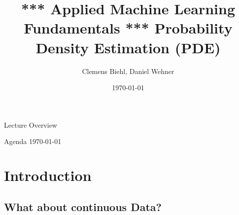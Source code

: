 


\title[Probability Density Estimation]{*** Applied Machine Learning Fundamentals *** Probability Density Estimation (PDE)}
\author{Clemens Biehl, Daniel Wehner}
\date{\today}




\maketitlepage


\begin{frame}{Lecture Overview}{}
\end{frame}


\begin{frame}{Agenda \today}
	\begin{multicols}{2}
		\tableofcontents
	\end{multicols}
\end{frame}


\section{Introduction}

\subsection{What about continuous Data?}

